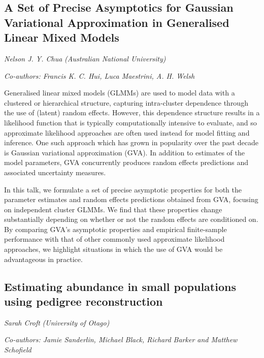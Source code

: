 \documentclass[
]{scrreprt}
\begin{document}
\subsection{A Set of Precise Asymptotics for Gaussian Variational
Approximation in Generalised Linear Mixed
Models}\label{a-set-of-precise-asymptotics-for-gaussian-variational-approximation-in-generalised-linear-mixed-models}

\emph{Nelson J. Y. Chua} \emph{(Australian
National University)}

\emph{Co-authors: Francis K. C. Hui, Luca Maestrini, A. H. Welsh}

\setlength{\parskip}{0.5em}

Generalised linear mixed models (GLMMs) are used to model data with a
clustered or hierarchical structure, capturing intra-cluster dependence
through the use of (latent) random effects. However, this dependence
structure results in a likelihood function that is typically
computationally intensive to evaluate, and so approximate likelihood
approaches are often used instead for model fitting and inference. One
such approach which has grown in popularity over the past decade is
Gaussian variational approximation (GVA). In addition to estimates of
the model parameters, GVA concurrently produces random effects
predictions and associated uncertainty measures.

In this talk, we formulate a set of precise asymptotic properties for
both the parameter estimates and random effects predictions obtained
from GVA, focusing on independent cluster GLMMs. We find that these
properties change substantially depending on whether or not the random
effects are conditioned on. By comparing GVA's asymptotic properties and
empirical finite-sample performance with that of other commonly used
approximate likelihood approaches, we highlight situations in which the
use of GVA would be advantageous in practice.

\subsection{Estimating abundance in small populations using pedigree
reconstruction}\label{estimating-abundance-in-small-populations-using-pedigree-reconstruction}

\emph{Sarah Croft} \emph{(University of Otago)}

\emph{Co-authors: Jamie Sanderlin, Michael Black, Richard Barker and
Matthew Schofield}
\end{document}

